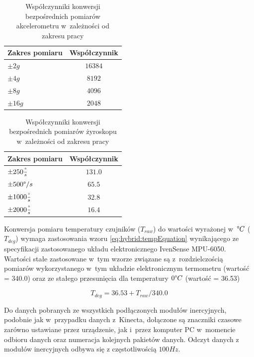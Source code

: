 \begin{table}[h]
	\centering
	\caption{Współczynniki konwersji bezpośrednich pomiarów akcelerometru w~zależności od zakresu pracy}
	\label{tab:hybrid:accRangeFactors} 
	\begin{tabular}{|l|c|}
		\hline
		Zakres pomiaru              & Współczynnik \\ \hline
		$\pm2g$                     & $16384$        \\ \hline
		\rowcolor{black!20} $\pm4g$ & $8192$         \\ \hline
		$\pm8g$                     & $4096$         \\ \hline
		$\pm16g$                    & $2048$         \\ \hline
	\end{tabular}
\end{table}
\begin{table}[h]
	\centering
	\caption{Współczynniki konwersji bezpośrednich pomiarów żyroskopu w~zależności od zakresu pracy}	
	\label{tab:hybrid:gyroRangeFactors}	
	\begin{tabular}{|l|c|}
		\hline
		Zakres pomiaru                        & Współczynnik \\ \hline
		$\pm250\frac{\degree}{s}$             & $131.0$        \\ \hline
		\rowcolor{black!20} $\pm500\degree/s$ & $65.5$         \\ \hline
		$\pm1000\frac{\degree}{s}$            & $32.8$         \\ \hline
		$\pm2000\frac{\degree}{s}$            & $16.4$         \\ \hline
	\end{tabular}
\end{table} 		
		 
		
Konwersja pomiaru temperatury czujników ($T_{raw}$) do wartości wyrażonej w~$\degree C$ ($T_{deg}$) wymaga zastosowania wzoru \ref{eq:hybrid:tempEquation} wynikającego ze specyfikacji zastosowanego układu elektronicznego IvenSense MPU-6050. Wartości stałe zastosowane w~tym wzorze związane są z~rozdzielczością pomiarów wykorzystanego w~tym układzie elektronicznym termometru (wartość = 340.0) oraz ze stałego przesunięcia dla temperatury $0 \degree C$ (wartość = 36.53)
		
\begin{equation}
	T_{deg} = 36.53 + T_{raw} / 340.0
	\label{eq:hybrid:tempEquation}
\end{equation}
		
Do danych pobranych ze wszystkich podłączonych modułów inercyjnych, podobnie jak w~przypadku danych z~Kinecta, dołączone są znaczniki czasowe zarówno ustawiane przez urządzenie, jak i~przez komputer PC w~momencie odbioru danych oraz numeracja kolejnych pakietów danych. Odczyt danych z modułów inercyjnych odbywa się z częstotliwością $100Hz$.
		
